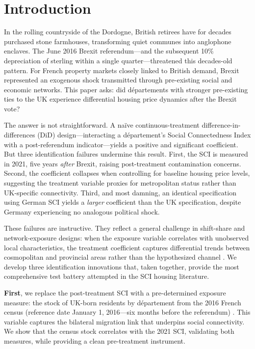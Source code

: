 \documentclass[12pt]{article}
\begin{document}
\newpage

\section{Introduction}

In the rolling countryside of the Dordogne, British retirees have for decades purchased stone farmhouses, transforming quiet communes into anglophone enclaves. The June 2016 Brexit referendum---and the subsequent 10\% depreciation of sterling within a single quarter---threatened this decades-old pattern. For French property markets closely linked to British demand, Brexit represented an exogenous shock transmitted through pre-existing social and economic networks. This paper asks: did d\'epartements with stronger pre-existing ties to the UK experience differential housing price dynamics after the Brexit vote?

The answer is not straightforward. A na\"ive continuous-treatment difference-in-differences (DiD) design---interacting a d\'epartement's Social Connectedness Index \citep[SCI;][]{bailey2018social} with a post-referendum indicator---yields a positive and significant coefficient. But three identification failures undermine this result. First, the SCI is measured in 2021, five years \textit{after} Brexit, raising post-treatment contamination concerns. Second, the coefficient collapses when controlling for baseline housing price levels, suggesting the treatment variable proxies for metropolitan status rather than UK-specific connectivity. Third, and most damning, an identical specification using German SCI yields a \textit{larger} coefficient than the UK specification, despite Germany experiencing no analogous political shock.

These failures are instructive. They reflect a general challenge in shift-share and network-exposure designs: when the exposure variable correlates with unobserved local characteristics, the treatment coefficient captures differential trends between cosmopolitan and provincial areas rather than the hypothesized channel \citep{borusyak2022quasi, goldsmith2020bartik, adao2019shift}. We develop three identification innovations that, taken together, provide the most comprehensive test battery attempted in the SCI housing literature.

\textbf{First}, we replace the post-treatment SCI with a pre-determined exposure measure: the stock of UK-born residents by d\'epartement from the 2016 French census (reference date January 1, 2016---six months before the referendum) \citep{insee2019premiere}. This variable captures the bilateral migration link that underpins social connectivity. We show that the census stock correlates with the 2021 SCI, validating both measures, while providing a clean pre-treatment instrument.
\end{document}
